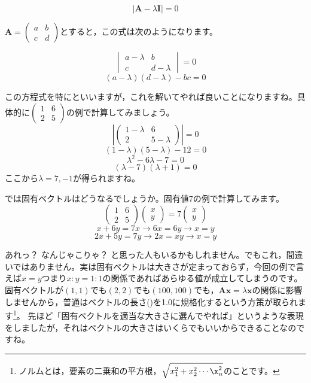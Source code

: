 \documentclass{ltjsbook}
\begin{document}
\[ | \bm{A} - \lambda \bm{I} | = 0 \]

$\bm{A} = \begin{pmatrix} a & b \\ c & d \end{pmatrix} $とすると，この式は次のようになります。

\[   \begin{vmatrix} a-\lambda & b \\ c & d - \lambda \end{vmatrix} = 0 \]
\[ (a-\lambda)(d-\lambda) - bc = 0 \]

この方程式を特にといいますが，これを解いてやれば良いことになりますね。具体的に$\begin{pmatrix}1&6\\2&5\end{pmatrix}$の例で計算してみましょう。
\[ |\begin{pmatrix}1-\lambda & 6 \\ 2 & 5-\lambda\end{pmatrix}| =0\]
\[ (1-\lambda)(5-\lambda) - 12 = 0 \]
\[ \lambda^2 - 6\lambda -7 = 0 \]
\[ (\lambda-7)(\lambda+1)=0\]
ここから$\lambda=7,-1$が得られますね。

では固有ベクトルはどうなるでしょうか。固有値7の例で計算してみます。
\[ \begin{pmatrix} 1 & 6 \\ 2 & 5 \end{pmatrix}\begin{pmatrix} x\\y\end{pmatrix} = 7 \begin{pmatrix} x\\y\end{pmatrix} \]
\[ x + 6y = 7x \to 6x = 6y \to x=y \]
\[ 2x+5y = 7y \to 2x = xy \to x=y \]

あれっ？ なんじゃこりゃ？ と思った人もいるかもしれません。でもこれ，間違いではありません。実は固有ベクトルは大きさが定まっておらず，今回の例で言えば$x=y$つまり$x:y=1:1$の関係であればあらゆる値が成立してしまうのです。
固有ベクトルが$(1,1)$でも$(2,2)$でも$(100,100)$でも，$\bm{Ax}=\lambda \bm{x}$の関係に影響しませんから，普通はベクトルの長さ()を1.0に規格化するという方策が取られます\footnote{ノルムとは，要素の二乗和の平方根，$\sqrt{x_1^2 + x_2^2 \cdots \x_n^2}$のことです。}。
先ほど「固有ベクトルを適当な大きさに選んでやれば」というような表現をしましたが，それはベクトルの大きさはいくらでもいいからできることなのですね。
\end{document}
